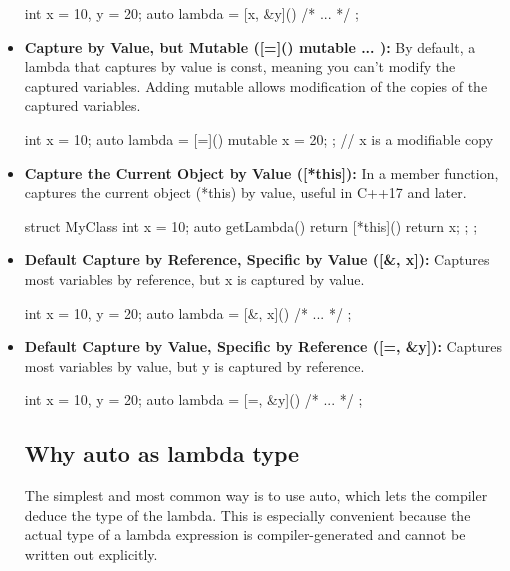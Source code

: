 \documentclass{report}
\begin{document}
\begin{itemize}
            \smallbreak \noindent
            \begin{cppcode}
                int x = 10, y = 20;
                auto lambda = [x, &y]() { /* ... */ };
            \end{cppcode}
        \item \textbf{Capture by Value, but Mutable ([=]() mutable { ... }):} By default, a lambda that captures by value is const, meaning you can't modify the captured variables. Adding mutable allows modification of the copies of the captured variables.
            \smallbreak \noindent
            \begin{cppcode}
                int x = 10;
                auto lambda = [=]() mutable { x = 20; }; // x is a modifiable copy
            \end{cppcode}
        \item \textbf{Capture the Current Object by Value ([*this]):} In a member function, captures the current object (*this) by value, useful in C++17 and later.
            \smallbreak \noindent
            \begin{cppcode}
                struct MyClass {
                int x = 10;
                auto getLambda() { return [*this]() { return x; }; }
            };
            \end{cppcode}
        \item \textbf{Default Capture by Reference, Specific by Value ([&, x]):} Captures most variables by reference, but x is captured by value.
            \smallbreak \noindent
            \begin{cppcode}
                int x = 10, y = 20;
                auto lambda = [&, x]() { /* ... */ };
            \end{cppcode}
        \item \textbf{Default Capture by Value, Specific by Reference ([=, &y]):} Captures most variables by value, but y is captured by reference.
            \smallbreak \noindent
            \begin{cppcode}
                int x = 10, y = 20;
                auto lambda = [=, &y]() { /* ... */ };
            \end{cppcode}

        \bigbreak \noindent 
        \subsection{Why auto as lambda type}
        \bigbreak \noindent 
        \begin{concept}
            The simplest and most common way is to use auto, which lets the compiler deduce the type of the lambda. This is especially convenient because the actual type of a lambda expression is compiler-generated and cannot be written out explicitly.
        \end{concept}
        
    \end{itemize}
\end{document}

